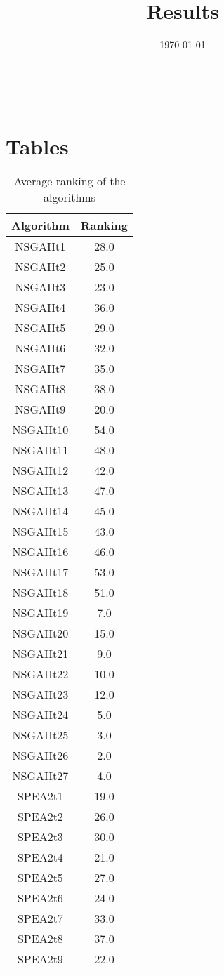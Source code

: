 \documentclass{article}
\title{Results}
\author{}
\date{\today}
\begin{document}
\oddsidemargin 0in \topmargin 0in\maketitle
\
\section{Tables}
\begin{table}[!htp]
\centering
\caption{Average ranking of the algorithms}
\begin{tabular}{c|c}
Algorithm&Ranking\\
\hline
NSGAIIt1&28.0\\
NSGAIIt2&25.0\\
NSGAIIt3&23.0\\
NSGAIIt4&36.0\\
NSGAIIt5&29.0\\
NSGAIIt6&32.0\\
NSGAIIt7&35.0\\
NSGAIIt8&38.0\\
NSGAIIt9&20.0\\
NSGAIIt10&54.0\\
NSGAIIt11&48.0\\
NSGAIIt12&42.0\\
NSGAIIt13&47.0\\
NSGAIIt14&45.0\\
NSGAIIt15&43.0\\
NSGAIIt16&46.0\\
NSGAIIt17&53.0\\
NSGAIIt18&51.0\\
NSGAIIt19&7.0\\
NSGAIIt20&15.0\\
NSGAIIt21&9.0\\
NSGAIIt22&10.0\\
NSGAIIt23&12.0\\
NSGAIIt24&5.0\\
NSGAIIt25&3.0\\
NSGAIIt26&2.0\\
NSGAIIt27&4.0\\
SPEA2t1&19.0\\
SPEA2t2&26.0\\
SPEA2t3&30.0\\
SPEA2t4&21.0\\
SPEA2t5&27.0\\
SPEA2t6&24.0\\
SPEA2t7&33.0\\
SPEA2t8&37.0\\
SPEA2t9&22.0\\

\end{tabular}
\end{table}
\end{document}
